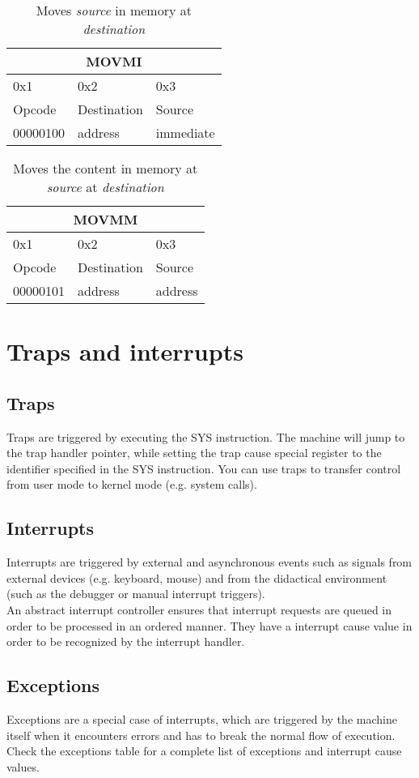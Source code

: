 \documentclass{article}
\begin{document}
\begin{table}[h!]
  \centering
  \begin{tabular} { | p{2cm} | | p{2cm} | p{2cm} |}
    \hline
    \multicolumn{3}{|c|}{MOVMI}\\
    \hline
    0x1 & 0x2 & 0x3\\
    \hline
    Opcode & Destination & Source\\
    00000100 & address & immediate\\
    \hline
  \end{tabular}
  \caption{Moves \textit{source} in memory at \textit{destination}}
\end{table}

\begin{table}[h!]
  \centering
  \begin{tabular} { | p{2cm} | | p{2cm} | p{2cm} |}
    \hline
    \multicolumn{3}{|c|}{MOVMM}\\
    \hline
    0x1 & 0x2 & 0x3\\
    \hline
    Opcode & Destination & Source\\
    00000101 & address & address\\
    \hline
  \end{tabular}
  \caption{Moves the content in memory at \textit{source} at \textit{destination}}
\end{table}

\section{Traps and interrupts}
\subsection{Traps}
Traps are triggered by executing the SYS instruction. The machine will jump to the trap handler pointer, while setting the trap cause special register to the identifier specified in the SYS instruction. You can use traps to transfer control from user mode to kernel mode (e.g. system calls).
\subsection{Interrupts}
Interrupts are triggered by external and asynchronous events such as signals from external devices (e.g. keyboard, mouse) and from the didactical environment (such as the debugger or manual interrupt triggers). \\An abstract interrupt controller ensures that interrupt requests are queued in order to be processed in an ordered manner. They have a interrupt cause value in order to be recognized by the interrupt handler.
\subsection{Exceptions}
Exceptions are a special case of interrupts, which are triggered by the machine itself when it encounters errors and has to break the normal flow of execution. Check the exceptions table for a complete list of exceptions and interrupt cause values.

\newpage
\end{document}
